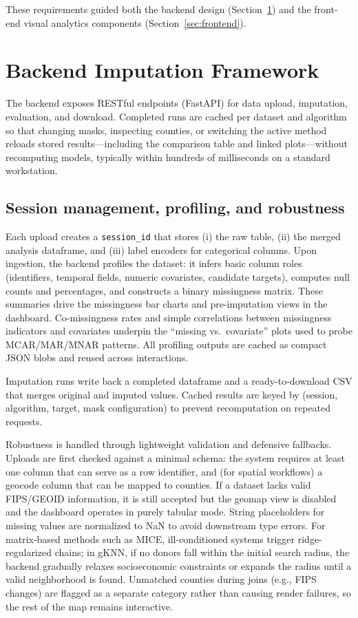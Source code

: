 \documentclass[review]{vgtc}
\newcommand{\gknn}{gKNN\xspace}
\newcommand{\mice}{MICE\xspace}
\begin{document}
These requirements guided both the backend design (Section~\ref{sec:backend}) and the front-end visual analytics components (Section~\ref{sec:frontend}).


\section{Backend Imputation Framework}
\label{sec:backend}
The backend exposes RESTful endpoints (FastAPI) for data upload, imputation, evaluation, and download. Completed runs are cached per dataset and algorithm so that changing masks, inspecting counties, or switching the active method reloads stored results---including the comparison table and linked plots---without recomputing models, typically within hundreds of milliseconds on a standard workstation.

\subsection{Session management, profiling, and robustness}
Each upload creates a \texttt{session\_id} that stores (i) the raw table, (ii) the merged analysis dataframe, and (iii) label encoders for categorical columns. Upon ingestion, the backend profiles the dataset: it infers basic column roles (identifiers, temporal fields, numeric covariates, candidate targets), computes null counts and percentages, and constructs a binary missingness matrix. These summaries drive the missingness bar charts and pre-imputation views in the dashboard. Co-missingness rates and simple correlations between missingness indicators and covariates underpin the ``missing vs.\ covariate'' plots used to probe MCAR/MAR/MNAR patterns. All profiling outputs are cached as compact JSON blobs and reused across interactions.

Imputation runs write back a completed dataframe and a ready-to-download CSV that merges original and imputed values. Cached results are keyed by (session, algorithm, target, mask configuration) to prevent recomputation on repeated requests.

Robustness is handled through lightweight validation and defensive fallbacks. Uploads are first checked against a minimal schema: the system requires at least one column that can serve as a row identifier, and (for spatial workflows) a geocode column that can be mapped to counties. If a dataset lacks valid FIPS/GEOID information, it is still accepted but the geomap view is disabled and the dashboard operates in purely tabular mode. String placeholders for missing values are normalized to NaN to avoid downstream type errors. For matrix-based methods such as \mice, ill-conditioned systems trigger ridge-regularized chains; in \gknn, if no donors fall within the initial search radius, the backend gradually relaxes socioeconomic constraints or expands the radius until a valid neighborhood is found. Unmatched counties during joins (e.g., FIPS changes) are flagged as a separate category rather than causing render failures, so the rest of the map remains interactive.
\end{document}
